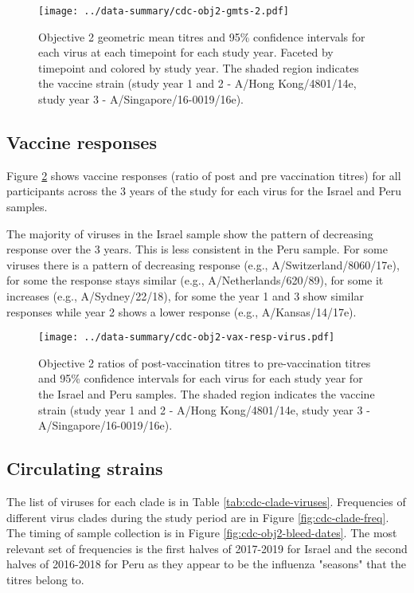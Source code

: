 \documentclass[12pt]{article}
\begin{document}
\begin{figure}
	\texttt{[image: ../data-summary/cdc-obj2-gmts-2.pdf]}
	\caption{Objective 2 geometric mean titres and 95\% confidence intervals for each virus at each timepoint for each study year. Faceted by timepoint and colored by study year. The shaded region indicates the vaccine strain (study year 1 and 2 - A/Hong Kong/4801/14e, study year 3 - A/Singapore/16-0019/16e).}
	\label{fig:cdc-obj2-gmts-2}
\end{figure}

\subsection{Vaccine responses}

Figure \ref{fig:cdc-obj2-vax-resp-virus} shows vaccine responses (ratio of post and pre vaccination titres)
for all participants across the 3 years of the study for each virus for the Israel and Peru samples.

The majority of viruses in the Israel sample show the pattern of decreasing response over the 3 years. This is less consistent in the Peru sample. For some viruses
there is a pattern of decreasing response (e.g., A/Switzerland/8060/17e), for some the response stays similar (e.g., A/Netherlands/620/89), for some it increases
(e.g., A/Sydney/22/18), for some the year 1 and 3 show similar responses while
year 2 shows a lower response (e.g., A/Kansas/14/17e).

\begin{figure}
	\texttt{[image: ../data-summary/cdc-obj2-vax-resp-virus.pdf]}
	\caption{Objective 2 ratios of post-vaccination titres to pre-vaccination titres and 95\% confidence intervals for each virus for each study year for the Israel and Peru samples. The shaded region indicates the vaccine strain (study year 1 and 2 - A/Hong Kong/4801/14e, study year 3 - A/Singapore/16-0019/16e).}
	\label{fig:cdc-obj2-vax-resp-virus}
\end{figure}

\subsection{Circulating strains}

The list of viruses for each clade is in Table \ref{tab:cdc-clade-viruses}. Frequencies of different virus clades during the study period are in Figure \ref{fig:cdc-clade-freq}. The timing of sample collection is in Figure \ref{fig:cdc-obj2-bleed-dates}. The most relevant set of frequencies is the first halves of 2017-2019 for Israel and the second halves of 2016-2018 for Peru as they appear to be the influenza "seasons" that the titres belong to.
\end{document}
